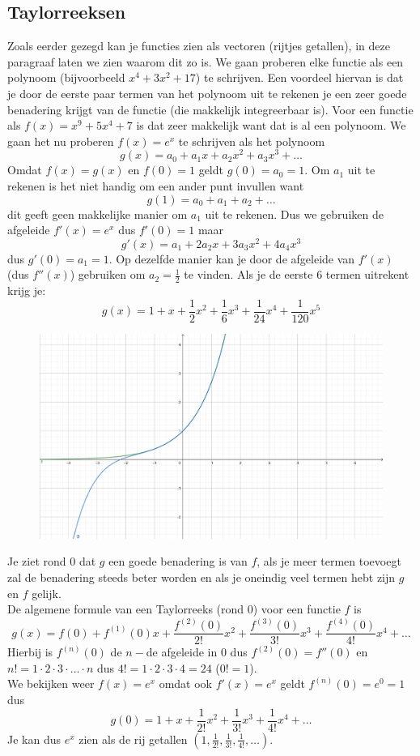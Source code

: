 \documentclass[../main.tex]{subfiles}
\begin{document}
\subsection*{Taylorreeksen}
Zoals eerder gezegd kan je functies zien als vectoren (rijtjes getallen), in deze paragraaf laten we zien waarom dit zo is. We gaan proberen elke functie als een polynoom (bijvoorbeeld $x^4+3x^2+17$) te schrijven. Een voordeel hiervan is dat je door de eerste paar termen van het polynoom uit te rekenen je een zeer goede benadering krijgt van de functie (die makkelijk integreerbaar is). Voor een functie als $f(x)=x^9+5x^4+7$ is dat zeer makkelijk want dat is al een polynoom. We gaan het nu proberen $f(x)=e^x$ te schrijven als het polynoom $$g(x)=a_0+a_1x+a_2x^2+a_3x^3+\ldots$$ Omdat $f(x)=g(x)$ en $f(0)=1$ geldt $g(0)=a_0=1$. Om $a_1$ uit te rekenen is het niet handig om een ander punt invullen want $$g(1)=a_0+a_1+a_2+\ldots$$ dit geeft geen makkelijke manier om $a_1$ uit te rekenen. Dus we gebruiken de afgeleide $f'(x)=e^x$ dus $f'(0)=1$ maar $$g'(x)=a_1+2a_2x+3a_3x^2+4a_4x^3$$
dus $g'(0)=a_1=1$. Op dezelfde manier kan je door de afgeleide van $f'(x)$ (dus $f''(x)$) gebruiken om $a_2=\frac{1}{2}$ te vinden. Als je de eerste 6 termen uitrekent krijg je: $$g(x)=1+x+\frac{1}{2}x^2+\frac{1}{6}x^3+\frac{1}{24}x^4+\frac{1}{120}x^5$$
\begin{figure}[h]
    \centering
    \includegraphics[width=.55\textwidth]{./img/taylor.png}
    \label{fig:my_label}
\end{figure}

Je ziet rond 0 dat $g$ een goede benadering is van $f$, als je meer termen toevoegt zal de benadering steeds beter worden en als je oneindig veel termen hebt zijn $g$ en $f$ gelijk.\\
De algemene formule van een Taylorreeks (rond 0) voor een functie $f$ is $$g(x)=f(0)+f^{(1)}(0)x+\frac{f^{(2)}(0)}{2!}x^2+\frac{f^{(3)}(0)}{3!}x^3+\frac{f^{(4)}(0)}{4!}x^4+\ldots$$
Hierbij is $f^{(n)}(0)$ de $n-$de afgeleide in 0 dus $f^{(2)}(0)=f''(0)$ en $n!=1\cdot2\cdot3\cdot\ldots\cdot n$ dus $4!=1\cdot2\cdot3\cdot4=24$ ($0!=1$).\\
We bekijken weer $f(x)=e^x$ omdat ook $f'(x)=e^x$ geldt $f^{(n)}(0)=e^0=1$ dus $$g(0)=1+x+\frac{1}{2!}x^2+\frac{1}{3!}x^3+\frac{1}{4!}x^4+\ldots$$
Je kan dus $e^x$ zien als de rij getallen $(1,\frac{1}{2!},\frac{1}{3!},\frac{1}{4!},\ldots)$.
\end{document}
